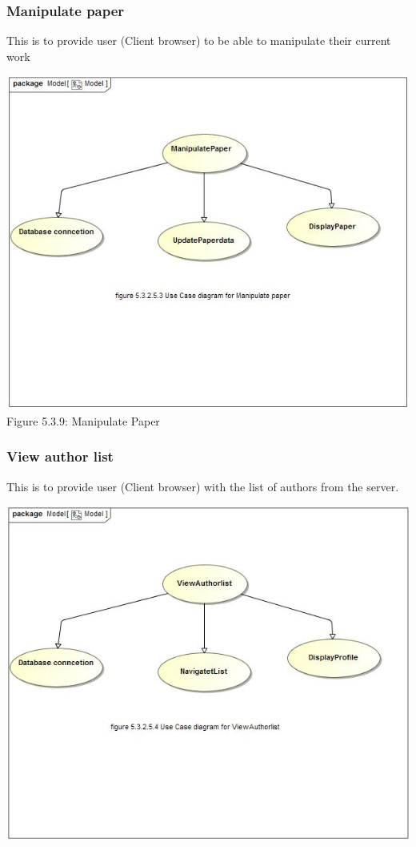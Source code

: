 \documentclass[hidelinks,a4paper,12pt]{article}
\begin{document}
		\subsubsection{Manipulate paper} 
		
		This is to provide user (Client browser) to be able to manipulate their current work  	
		
		\includegraphics[width=1\textwidth]{./Graphs/UseCaseforManipulatePaper.JPG}\\[0.4cm]
		Figure 5.3.9: Manipulate Paper
		
		
		\subsubsection{View author list}
		
		This is to provide user (Client browser) with the list of authors from the server.
		
		\includegraphics[width=1\textwidth]{./Graphs/UseCasediagramforViewAuthorList.JPG}\\[0.4cm]
		
\end{document}
